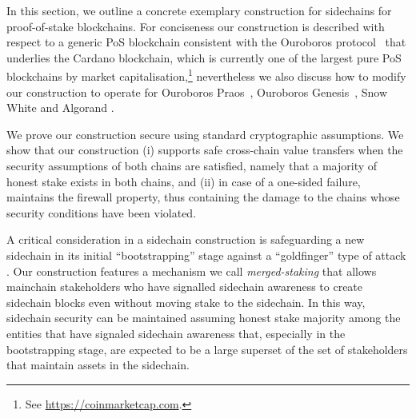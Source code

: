In this section, we outline a concrete exemplary
construction for sidechains for proof-of-stake
blockchains. For conciseness our construction is described
with respect to a generic PoS blockchain consistent with the  Ouroboros
protocol~\cite{ouroboros} that underlies the Cardano blockchain, which is currently one of the largest
pure PoS blockchains by market capitalisation,\footnote{See \url{https://coinmarketcap.com}. }
nevertheless we also discuss how to modify our construction to
operate for
Ouroboros Praos~\cite{praos},
Ouroboros Genesis~\cite{genesis},
Snow White \cite{snowwhite}
and
Algorand \cite{algorand}.

We prove our construction secure   using standard cryptographic
assumptions. We show that our construction (i) supports safe cross-chain value
transfers when the security assumptions of both chains are satisfied, namely
that a majority of honest stake exists in both chains, and (ii) in case of a
one-sided failure,  maintains the firewall property, thus
containing the damage
to the chains whose security conditions have been violated.
%

A critical consideration in a sidechain construction is safeguarding
a new sidechain in its initial ``bootstrapping'' stage against a ``goldfinger'' type of attack \cite{mining-economics,hostile}. Our construction
features a mechanism we call {\em merged-staking}
that allows  mainchain stakeholders who have signalled
sidechain awareness to create sidechain blocks even without moving stake
to the sidechain. In this way, sidechain security can be maintained
assuming honest stake majority among the entities that have signaled sidechain
awareness that, especially in the bootstrapping stage, are expected to be
a large superset of the set of stakeholders that maintain assets
in the sidechain.


